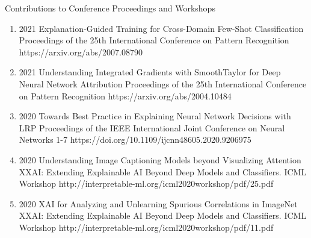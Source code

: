 \documentclass[10pt,a4paper]{article} %
\begin{document}
\headedsection %
{Contributions to Conference Proceedings and Workshops}{}
{
    \begin{enumerate}

        \item {}
                                {2021}
                                {Explanation-Guided Training for Cross-Domain Few-Shot Classification}
                                {Proceedings of the 25th International Conference on Pattern Recognition}
                                {}
                                {https://arxiv.org/abs/2007.08790}

        \item {}
                                {2021}
                                {Understanding Integrated Gradients with SmoothTaylor for Deep Neural Network Attribution}
                                {Proceedings of the 25th International Conference on Pattern Recognition}
                                {}
                                {https://arxiv.org/abs/2004.10484}

        \item {}
                                {2020}
                                {Towards Best Practice in Explaining Neural Network Decisions with LRP}
                                {Proceedings of the IEEE International Joint Conference on Neural Networks}
                                {1-7}
                                {https://doi.org/10.1109/ijcnn48605.2020.9206975}

        \item {}
                                {2020}
                                {Understanding Image Captioning Models beyond Visualizing Attention}
                                {XXAI: Extending Explainable AI Beyond Deep Models and Classifiers. ICML Workshop}
                                {}
                                {http://interpretable-ml.org/icml2020workshop/pdf/25.pdf}


        \item {}
                                {2020}
                                {XAI for Analyzing and Unlearning Spurious Correlations in ImageNet}
                                {XXAI: Extending Explainable AI Beyond Deep Models and Classifiers. ICML Workshop}
                                {}
                                {http://interpretable-ml.org/icml2020workshop/pdf/11.pdf}



\end{enumerate}}
\end{document}
